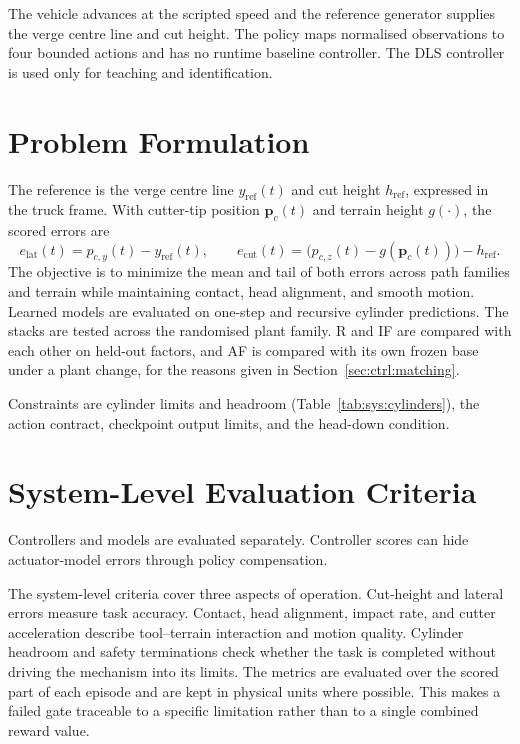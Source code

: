 The vehicle advances at the scripted speed and the reference generator supplies
the verge centre line and cut height. The policy maps normalised observations to
four bounded actions and has no runtime baseline controller. The DLS controller
is used only for teaching and identification.

\section{Problem Formulation}
\label{sec:sys:problem}

The reference is the verge centre line $y_{\mathrm{ref}}(t)$ and cut height
$h_{\mathrm{ref}}$, expressed in the truck frame. With cutter-tip position
$\bm{p}_c(t)$ and terrain height $g(\cdot)$, the scored errors are
%
\begin{equation}
  \label{eq:sys:error}
  e_{\mathrm{lat}}(t) = p_{c,y}(t) - y_{\mathrm{ref}}(t),
  \qquad
  e_{\mathrm{cut}}(t)
    = \bigl(p_{c,z}(t) - g(\bm{p}_c(t))\bigr) - h_{\mathrm{ref}} .
\end{equation}
%
The objective is to minimize the mean and tail of both errors across path
families and terrain while maintaining contact, head alignment, and smooth
motion. Learned models are evaluated on one-step and recursive cylinder
predictions. The stacks are tested across the randomised plant family. R and IF are compared
with each other on held-out factors, and AF is compared with its own frozen base
under a plant change, for the reasons given in
Section~\ref{sec:ctrl:matching}.

Constraints are cylinder limits and headroom
(Table~\ref{tab:sys:cylinders}), the action contract, checkpoint output limits,
and the head-down condition.

\section{System-Level Evaluation Criteria}
\label{sec:sys:evaluation-criteria}

Controllers and models are evaluated separately. Controller scores can hide
actuator-model errors through policy compensation.

The system-level criteria cover three aspects of operation. Cut-height and
lateral errors measure task accuracy. Contact, head alignment, impact rate,
and cutter acceleration describe tool--terrain interaction and motion quality.
Cylinder headroom and safety terminations check whether the task is completed
without driving the mechanism into its limits. The metrics are evaluated over
the scored part of each episode and are kept in physical units where possible.
This makes a failed gate traceable to a specific limitation rather than to a
single combined reward value.

